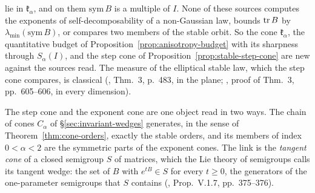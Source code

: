 lie in
$\mathfrak k_\alpha$, and on them $\mathrm{sym}\,B$ is a multiple of $I$. None
of these sources computes the exponents of self-decomposability of a non-Gaussian law, bounds $\operatorname{tr} B$
by $\lambda_{\min}(\mathrm{sym}\,B)$, or compares two members of the stable orbit. So the cone
$\mathfrak k_\alpha$, the quantitative budget of Proposition~\ref{prop:anisotropy-budget} with its sharpness
through $S_\alpha(I)$, and the step cone of Proposition~\ref{prop:stable-step-cone} are new against the
sources read. The \Levy{} measure of the elliptical stable law, which the step cone compares, is
classical (, Thm.~3, p.~483, in the plane; ,
proof of Thm.~3, pp.~605--606, in every dimension).

The step cone and the exponent cone are one object read in two ways. The chain of cones $C_\alpha$
of \S\ref{sec:invariant-wedges} generates, in the sense of Theorem~\ref{thm:cone-orders}, exactly the stable
orders, and its members of index $0 < \alpha < 2$ are the symmetric parts of the exponent cones. The link is the
\emph{tangent cone} of a closed semigroup $S$ of matrices, which the Lie theory of semigroups calls its
tangent wedge: the set of $B$ with $e^{tB} \in S$ for every $t \ge 0$, the generators of the
one-parameter semigroups that $S$ contains (, Prop.~V.1.7, pp.~375--376).

